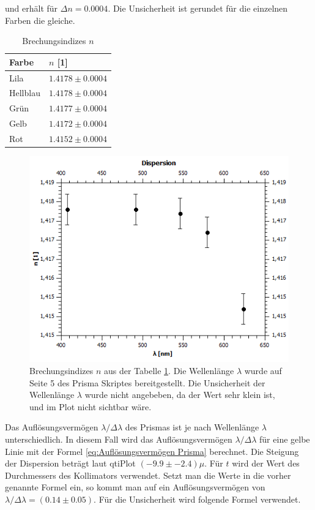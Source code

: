 \documentclass[12pt,a4paper,twoside]{article}
\begin{document}
\noindent
und erhält für $\Delta n = 0.0004$. Die Unsicherheit ist gerundet für die einzelnen Farben die gleiche. 

\begin{table}[H]
    \centering
    \caption{Brechungsindizes $n$}
    \label{tab:delta n}
    \begin{tabular}{| l | l |}
        \hline
        Farbe & $n$ [1] \\
        \hline
        Lila        & $ 1.4178 \pm 0.0004 $ \\
        Hellblau    & $ 1.4178 \pm 0.0004 $ \\
        Grün        & $ 1.4177 \pm 0.0004 $ \\
        Gelb        & $ 1.4172 \pm 0.0004 $ \\
        Rot         & $ 1.4152 \pm 0.0004 $ \\
        \hline
    \end{tabular}
\end{table}

\begin{figure}[H]
    \centering
    \includegraphics[width=0.6\linewidth]{nudes/Dispersion.png}
    \caption{Brechungsindizes $n$ aus der Tabelle \ref{tab:delta n}. Die Wellenlänge $\lambda$ wurde auf Seite 5 des Prisma Skriptes \cite{teachcenter2} bereitgestellt. Die Unsicherheit der Wellenlänge $\lambda$ wurde nicht angebeben, da der Wert sehr klein ist, und im Plot nicht sichtbar wäre.}
    \label{fig:Dispersion Prisma}
\end{figure}

\noindent
Das Auflösungsvermögen $\lambda / \Delta \lambda$ des Prismas ist je nach Wellenlänge $\lambda$ unterschiedlich. 
In diesem Fall wird das Auflösungsvermögen $\lambda / \Delta \lambda$  für eine gelbe Linie mit der Formel \ref{eq:Auflösungsvermögen Prisma} berechnet. 
Die Steigung der Dispersion beträgt laut qtiPlot $(-9.9 \pm -2.4 )\mu$. 
Für $t$ wird der Wert des Durchmessers des Kollimators verwendet.  
Setzt man die Werte in die vorher genannte Formel ein, so kommt man auf ein Auflösungsvermögen von $\lambda / \Delta \lambda = (0.14 \pm 0.05)$. 
Für die Unsicherheit wird folgende Formel verwendet. 
\end{document}
